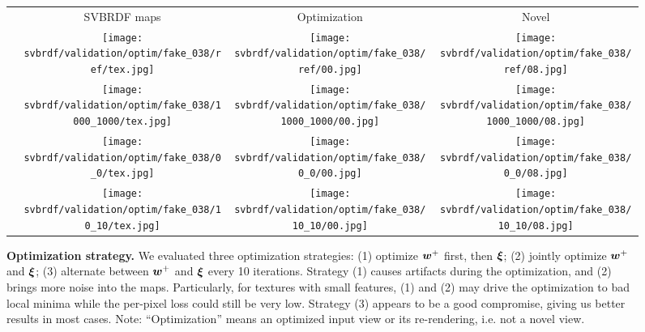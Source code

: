\begin{figure}[!ht]
	\centering
	\setlength{\resLen}{1.in}
	\setlength{\raiseLen}{0.4in}
	\addtolength{\tabcolsep}{-4pt}
	\begin{tabular}{cccc}
		  & SVBRDF maps & Optimization & Novel
		\\
		\raisebox{\raiseLen}{\rotatebox[origin=c]{90}{GT}} &
		\texttt{[image: svbrdf/validation/optim/fake\_038/ref/tex.jpg]} &
		\texttt{[image: svbrdf/validation/optim/fake\_038/ref/00.jpg]} &
		\texttt{[image: svbrdf/validation/optim/fake\_038/ref/08.jpg]}
		\\
		\raisebox{\raiseLen}{\rotatebox[origin=c]{0}{(1)}} &
		\texttt{[image: svbrdf/validation/optim/fake\_038/1000\_1000/tex.jpg]} &
		\texttt{[image: svbrdf/validation/optim/fake\_038/1000\_1000/00.jpg]} &
		\texttt{[image: svbrdf/validation/optim/fake\_038/1000\_1000/08.jpg]}
		\\
		\raisebox{\raiseLen}{\rotatebox[origin=c]{0}{(2)}} &
		\texttt{[image: svbrdf/validation/optim/fake\_038/0\_0/tex.jpg]} &
		\texttt{[image: svbrdf/validation/optim/fake\_038/0\_0/00.jpg]} &
		\texttt{[image: svbrdf/validation/optim/fake\_038/0\_0/08.jpg]}
		\\
		\raisebox{\raiseLen}{\rotatebox[origin=c]{0}{(3)}} &
		\texttt{[image: svbrdf/validation/optim/fake\_038/10\_10/tex.jpg]} &
		\texttt{[image: svbrdf/validation/optim/fake\_038/10\_10/00.jpg]} &
		\texttt{[image: svbrdf/validation/optim/fake\_038/10\_10/08.jpg]}
	\end{tabular}
	\caption[Optimization strategy]{\label{fig:svbrdf:strategy}
		\textbf{Optimization strategy.} We evaluated three optimization strategies: (1) optimize $\bm{w}^+$ first, then $\bm\xi$; (2) jointly optimize $\bm{w}^+$ and $\bm\xi$; (3) alternate between $\bm{w}^+$ and $\bm\xi$ every 10 iterations. Strategy (1) causes artifacts during the optimization, and (2) brings more noise into the maps. Particularly, for textures with small features, (1) and (2) may drive the optimization to bad local minima while the per-pixel loss could still be very low. Strategy (3) appears to be a good compromise, giving us better results in most cases. Note: ``Optimization'' means an optimized input view or its re-rendering, i.e. not a novel view.
	}
\end{figure}

